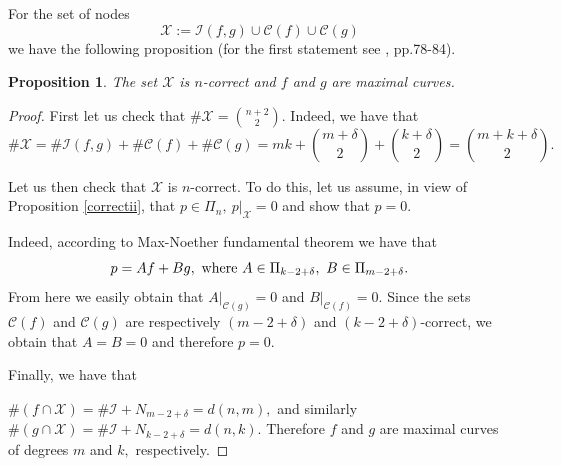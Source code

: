 \documentclass[a4paper,12pt]{article}
\newtheorem{proposition}[lemma]{Proposition}
\theoremstyle{definition}
\numberwithin{equation}{section}
\numberwithin{figure}{section}
\newcommand{\Cset}{\mathcal{C}}
\newcommand{\Iset}{\mathcal{I}}
\newcommand{\Xset}{\mathcal{X}}
\begin{document}
For the set of nodes $$\Xset:=\Iset(f,g)\cup\Cset(f)\cup\Cset(g)$$ we have the following proposition (for the first statement see \cite{HakopianBezout}, pp.78-84).
\begin{proposition} The set $\Xset$ is $n$-correct and $f$ and $g$ are maximal curves.
\end{proposition} 
\begin{proof} First let us check that $\#\Xset={n+2\choose 2}.$ Indeed, we have that
$$\#\Xset=\#\Iset(f,g)+\#\Cset(f)+\#\Cset(g)=mk+{m+\delta\choose 2}+{k+\delta\choose 2}={m+k+\delta\choose 2}.$$

Let us then check that $\Xset$ is $n$-correct. To do this, let us assume, in view of Proposition \ref{correctii}, that $p\in\Pi_n,\ p|_\Xset=0$ and show that $p=0.$

Indeed, according to Max-Noether fundamental theorem we have that
$$p=Af+Bg,\ \hbox{where}\ A\in\Pi_{k-2+\delta},\ B\in\Pi_{m-2+\delta}.$$
From here we easily obtain that $A|_{\Cset(g)}=0$ and $B|_{\Cset(f)}=0.$ Since the sets $\Cset(f)$ and $\Cset(g)$ are respectively $(m-2+\delta)$ and $(k-2+\delta)$-correct, we obtain that $A=B=0$ and therefore $p=0.$

Finally, we have that 

$\#(f\cap\Xset)=\#\Iset + N_{m-2+\delta}=d(n,m),$ and similarly $\#(g\cap\Xset)=\#\Iset + N_{k-2+\delta}=d(n,k).$ Therefore $f$ and $g$ are maximal curves of degrees $m$ and $k,$ respectively. 
\end{proof}
\end{document}
